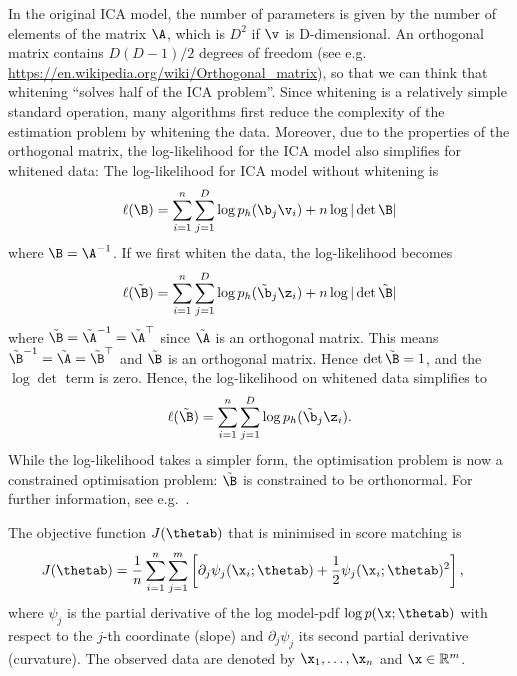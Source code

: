 \begin{exenumerate}
\begin{solution}
  In the original ICA model, the number of parameters is given by the
  number of elements of the matrix $\A$, which is $D^2$ if $\v$ is
  D-dimensional. An orthogonal matrix contains $D(D-1)/2$ degrees of
  freedom {\small (see
    e.g. \url{https://en.wikipedia.org/wiki/Orthogonal_matrix}}), so
  that we can think that whitening ``solves half of the ICA
  problem''. Since whitening is a relatively simple standard
  operation, many algorithms \citep[e.g.\ ``fastICA'',][]{Hyvarinen1999}
  first reduce the complexity of the estimation problem by whitening
  the data. Moreover, due to the properties of the orthogonal matrix,
  the log-likelihood for the ICA model also simplifies for whitened
  data: The log-likelihood for ICA model without whitening is
  \begin{equation}
    \ell(\B) = \sum_{i=1}^n  \sum_{j=1}^D\log p_h (\b_j \v_i) + n \log |\det \B|
  \end{equation}
  where $\B = \A^{-1}$. If we first whiten the data, the log-likelihood becomes
  \begin{equation}
    \ell(\tilde{\B}) = \sum_{i=1}^n  \sum_{j=1}^D\log p_h (\tilde{\b}_j \z_i) + n \log |\det \tilde{\B}|
  \end{equation}
  where $\tilde{\B} = \tilde{\A}^{-1} =\tilde{\A}^\top$ since $\tilde{\A}$ is
  an orthogonal matrix. This means $\tilde{\B}^{-1} = \tilde{\A} =
  \tilde{\B}^\top$ and $\tilde{\B}$ is an orthogonal matrix. Hence
  $\det \tilde{\B}=1$, and the $\log \det$ term is zero. Hence, the
  log-likelihood on whitened data simplifies to
   \begin{equation}
    \ell(\tilde{\B}) = \sum_{i=1}^n  \sum_{j=1}^D\log p_h (\tilde{\b}_j \z_i).
  \end{equation}
   While the log-likelihood takes a simpler form, the optimisation
   problem is now a constrained optimisation problem: $\tilde{\B}$ is
   constrained to be orthonormal. For further information, see
   e.g.\ \citep[Chapter 9]{Hyvarinen2001}.  
   
  \end{solution}
  
\end{exenumerate}



\label{ex:score-matching-exp-family}
The objective function $J(\thetab)$ that is minimised in score matching is
    \begin{align} 
      J(\thetab) &= \frac{1}{n} \sum_{i=1}^n \sum_{j=1}^m \left[ \partial_j
        \psi_j(\x_i;\thetab) + \frac{1}{2} \psi_j(\x_i;\thetab)^2 \right],\label{eq:Jsm-def}
    \end{align}
where $\psi_j$ is the partial derivative of the log model-pdf $\log
p(\x ;\thetab)$ with respect to the $j$-th coordinate (slope) and
$\partial_j \psi_j$ its second partial derivative (curvature). The
observed data are denoted by $\x_1,\ldots,\x_n$ and $\x \in
\mathbb{R}^m$.

